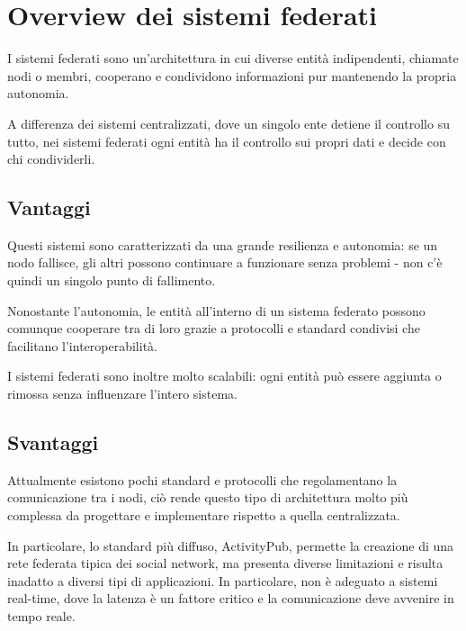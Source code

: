 \section{Overview dei sistemi federati}

I sistemi federati sono un'architettura in cui diverse entità indipendenti, chiamate nodi o membri,
cooperano e condividono informazioni pur mantenendo la propria autonomia.

A differenza dei sistemi centralizzati, dove un singolo ente detiene il controllo su tutto, nei sistemi federati
ogni entità ha il controllo sui propri dati e decide con chi condividerli.

\subsection{Vantaggi}

Questi sistemi sono caratterizzati da una grande resilienza e autonomia: se un nodo fallisce,
gli altri possono continuare a funzionare senza problemi - non c'è quindi un singolo punto di fallimento.

Nonostante l'autonomia, le entità all'interno di un sistema federato possono comunque cooperare
tra di loro grazie a protocolli e standard condivisi che facilitano l'interoperabilità.

I sistemi federati sono inoltre molto scalabili: ogni entità può essere aggiunta o rimossa senza influenzare
l'intero sistema.

\subsection{Svantaggi}

Attualmente esistono pochi standard e protocolli che regolamentano la comunicazione tra i nodi, ciò rende
questo tipo di architettura molto più complessa da progettare e implementare rispetto a quella centralizzata.

In particolare, lo standard più diffuso, ActivityPub, permette la creazione di una rete federata 
tipica dei social network, ma presenta diverse limitazioni e risulta inadatto a diversi tipi di applicazioni. In particolare,
non è adeguato a sistemi real-time, dove la latenza è un fattore critico e la comunicazione deve avvenire in tempo reale.